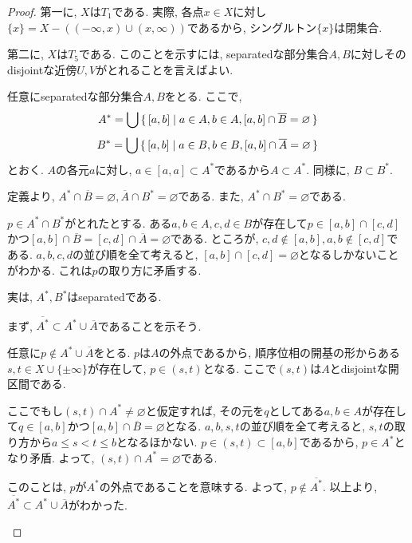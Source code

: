 \documentclass[a4paper, twoside]{bxjsarticle}
\theoremstyle{definition}
\begin{document}
        \begin{proof}
            第一に, $X$は$T_1$である. 実際, 各点$x\in X$に対し$\{x\}=X-((-\infty, x)\cup(x, \infty))$であるから, シングルトン$\{x\}$は閉集合.
            
            第二に, $X$は$T_5$である. このことを示すには, separatedな部分集合$A, B$に対しそのdisjointな近傍$U, V$がとれることを言えばよい.
            
            任意にseparatedな部分集合$A, B$をとる. ここで, \[A^*=\bigcup\set{[a, b]|a\in A, b\in A, [a, b]\cap \overline{B}=\varnothing}\]\[B^*=\bigcup\set{[a, b]|a\in B, b\in B, [a, b]\cap \overline{A}=\varnothing}\]とおく. $A$の各元$a$に対し, $a\in [a, a]\subset A^*$であるから$A\subset A^*$. 同様に, $B\subset B^*$.
            
            定義より, $A^*\cap\overline{B}=\varnothing, \overline{A}\cap B^*=\varnothing$である. また, $A^*\cap B^*=\varnothing$である.
            \begin{framed}
                $p\in A^*\cap B^*$がとれたとする. ある$a, b\in A, c, d\in B$が存在して$p\in [a,  b]\cap[c, d]$かつ$[a, b]\cap \overline{B}=[c, d]\cap \overline{A}=\varnothing$である. ところが, $c, d\not\in [a, b], a, b\not\in [c, d]$である. $a, b, c, d$の並び順を全て考えると, $[a, b]\cap[c, d]=\varnothing$となるしかないことがわかる. これは$p$の取り方に矛盾する.
            \end{framed}
            実は, $A^*, B^*$はseparatedである.
            \begin{framed}
            まず, $\overline{A^*}\subset A^*\cup\overline{A}$であることを示そう. 
            
            任意に$p\not\in A^*\cup\overline{A}$をとる. $p$は$A$の外点であるから, 順序位相の開基の形からある$s, t\in X\cup \{\pm \infty\}$が存在して, $p\in (s, t)$となる. ここで$(s, t)$は$A$とdisjointな開区間である.
            
            ここでもし$(s, t)\cap A^*\neq\varnothing$と仮定すれば, その元を$q$としてある$a, b\in A$が存在して$q\in [a, b]$かつ$[a, b]\cap\overline{B}=\varnothing$となる. $a, b, s, t$の並び順を全て考えると, $s, t$の取り方から$a\leq s<t\leq b$となるほかない. $p\in (s, t)\subset [a, b]$であるから, $p\in A^*$となり矛盾. よって, $(s, t)\cap A^*=\varnothing$である.
            
            このことは, $p$が$A^*$の外点であることを意味する. よって, $p\not\in \overline{A^*}$. 以上より, $\overline{A^*}\subset A^*\cup\overline{A}$がわかった. 
            

\end{framed}
\end{proof}
\end{document}
